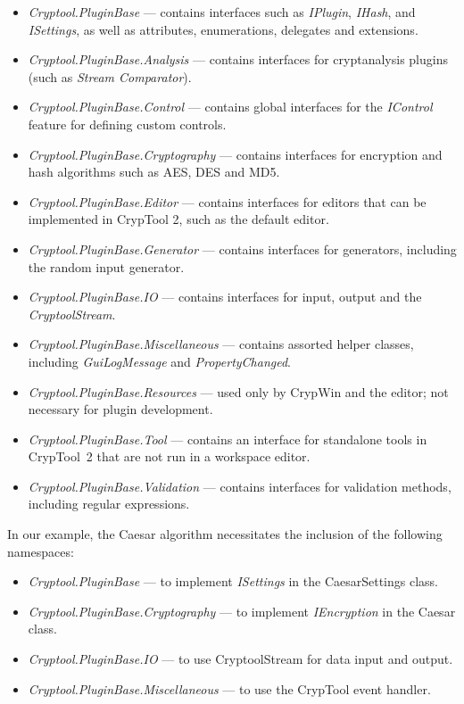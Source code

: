\begin{itemize}
	\item \textit{Cryptool.PluginBase} --- contains interfaces such as \textit{IPlugin}, \textit{IHash}, and \textit{ISettings}, as well as attributes, enumerations, delegates and extensions.
	\item \textit{Cryptool.PluginBase.Analysis} --- contains interfaces for cryptanalysis plugins (such as \textit{Stream Comparator}).
	\item \textit{Cryptool.PluginBase.Control} --- contains global interfaces for the \textit{IControl} feature for defining custom controls.
	\item \textit{Cryptool.PluginBase.Cryptography} --- contains interfaces for encryption and hash algorithms such as AES, DES and MD5.
	\item \textit{Cryptool.PluginBase.Editor} --- contains interfaces for editors that can be implemented in CrypTool 2, such as the default editor.
	\item \textit{Cryptool.PluginBase.Generator} --- contains interfaces for generators, including the random input generator.
	\item \textit{Cryptool.PluginBase.IO} --- contains interfaces for input, output and the \textit{CryptoolStream}.
	\item \textit{Cryptool.PluginBase.Miscellaneous} --- contains assorted helper classes, including \textit{GuiLogMessage} and \textit{PropertyChanged}.
	\item \textit{Cryptool.PluginBase.Resources} --- used only by CrypWin and the editor; not necessary for plugin development.
	\item \textit{Cryptool.PluginBase.Tool} --- contains an interface for standalone tools in CrypTool~2 that are not run in a workspace editor.
	\item \textit{Cryptool.PluginBase.Validation} --- contains interfaces for validation methods, including regular expressions.
\end{itemize}

\noindent In our example, the Caesar algorithm necessitates the inclusion of the following namespaces:

\begin{itemize}
	\item \textit{Cryptool.PluginBase} --- to implement \textit{ISettings} in the CaesarSettings class.
	\item \textit{Cryptool.PluginBase.Cryptography} --- to implement \textit{IEncryption} in the Caesar class.
	\item \textit{Cryptool.PluginBase.IO} --- to use CryptoolStream for data input and output.
	\item \textit{Cryptool.PluginBase.Miscellaneous} --- to use the CrypTool event handler.
\end{itemize}

